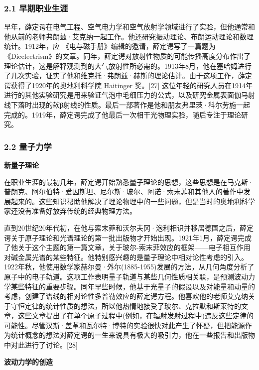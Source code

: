 \subsubsection{2.1 早期职业生涯}
早年，薛定谔在电气工程、空气电力学和空气放射学领域进行了实验，但他通常和他从前的老师弗朗兹·艾克纳一起工作。他还研究振动理论、布朗运动理论和数理统计。1912年，应 《电与磁手册》编辑的邀请，薛定谔写了一篇题为 《Dieelectrism》的文章。同年，薛定谔对放射性物质的可能传播高度分布作出了理论估计，这是解释观测到的大气放射性所必需的。1913年8月，他在塞哈姆进行了几次实验，证实了他和维克托·弗朗兹·赫斯的理论估计。由于这项工作，薛定谔获得了1920年的奥地利科学院 Haitinger 奖。[27] 这位年轻的研究人员在1914年进行的其他实验研究是用来验证气泡中毛细压力的公式，以及研究金属表面伽马射线下落时出现的软β射线的性质。最后一部著作是他和朋友弗里茨·科尔劳施一起完成的。1919年，薛定谔完成了他最后一次相干光物理实验，随后专注于理论研究。

\subsubsection{2.2 量子力学}
\textbf{新量子理论}

在职业生涯的最初几年，薛定谔开始熟悉量子理论的思想，这些思想是在马克斯·普朗克、阿尔伯特·爱因斯坦、尼尔斯·玻尔、阿诺·索末菲和其他人的著作中发展起来的。这些知识帮助他解决了理论物理中的一些问题，但是当时的奥地利科学家还没有准备好放弃传统的经典物理方法。

直到20世纪20年代初，在他与索末菲和沃尔夫冈·泡利相识并移居德国之后，薛定谔关于原子理论和光谱理论的第一批出版物才开始出现。1921年1月，薛定谔完成了他关于这个主题的第一篇文章，关于玻尔-索末菲效应的框架——电子相互作用对碱金属光谱的某些特征。他特别感兴趣的是量子理论中相对论性考虑的引入。1922年秋，他使用数学家赫尔曼·外尔(1885-1955)发展的方法，从几何角度分析了原子中的电子轨道。这项工作表明量子轨道与某些几何性质相关联，是预测波动力学某些特征的重要步骤。同年早些时候，他基于光量子的假设以及对能量和动量的考虑，创建了谱线的相对论性多普勒效应的薛定谔方程。他喜欢他的老师艾克纳关于守恒定律的统计性质的想法，所以他热情地接受了玻尔、克拉默和斯莱特的文章，这些文章提出了在单个原子过程中(例如，在辐射发射过程中)违反这些定律的可能性。尽管汉斯·盖革和瓦尔特·博特的实验很快对此产生了怀疑，但把能源作为统计概念的想法对薛定谔的一生来说具有极大的吸引力，他在一些报告和出版物中对此进行了讨论。[28]

\textbf{波动力学的创造}


